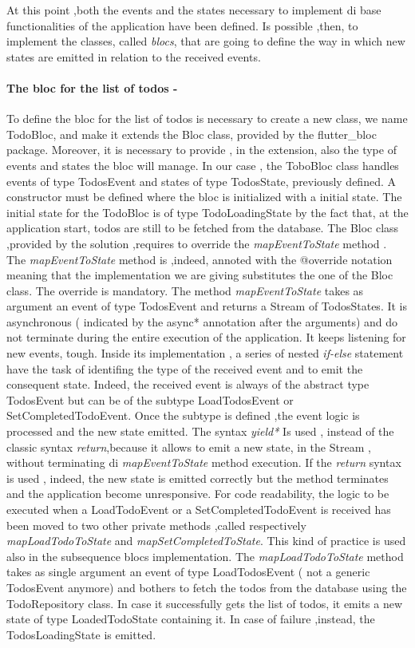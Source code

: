 At this point ,both the events and the states necessary to implement di base functionalities of the application have been defined. Is possible ,then, to implement the classes, called \textit{blocs}, that are going to define the way in which new states are emitted in relation to the received events.

\paragraph{The bloc for the list of todos - }
\label{subpar:todo_app_bloc_core_state}

To define the bloc for the list of todos is necessary to create a new class, we name TodoBloc, and make it extends the Bloc class, provided by the flutter\_bloc package. Moreover, it is necessary to provide , in the extension, also the type of events and states the bloc will manage. In our case , the ToboBloc class handles events of type TodosEvent and states of type TodosState, previously defined. A constructor must be defined where the bloc is initialized with a initial state. The initial state for the TodoBloc is of type TodoLoadingState by the fact that, at the application start, todos are still to be fetched from the database.
The Bloc class ,provided by the solution ,requires to override the \textit{mapEventToState} method . The \textit{mapEventToState} method is ,indeed, annoted with the @override notation meaning that the implementation we are giving substitutes the one of the Bloc class. The override is mandatory. The method \textit{mapEventToState} takes as argument an event of type TodosEvent and returns a Stream of TodosStates. It is asynchronous ( indicated by the async* annotation after the arguments) and do not terminate during the entire execution of the application. It keeps listening for new events, tough. Inside its implementation , a series of nested \textit{if-else }statement have the task of identifing the type of the received event and to emit the consequent state. Indeed, the received event is always of the abstract type TodosEvent but can be of the subtype LoadTodosEvent or SetCompletedTodoEvent. Once the subtype is defined ,the event logic is processed and the new state emitted.  The syntax \textit{yield*} Is used , instead of the classic syntax \textit{return},because it allows to emit a new state, in the Stream , without terminating di \textit{mapEventToState} method execution. If the \textit{return} syntax is used , indeed, the new state is emitted correctly but the method terminates and the application become unresponsive. For code readability, the logic to be executed when a LoadTodoEvent or a SetCompletedTodoEvent is received has been moved to two other private methods ,called respectively \textit{mapLoadTodoToState} and \textit{mapSetCompletedToState}. This kind of practice is used also in the subsequence blocs implementation. The \textit{mapLoadTodoToState} method takes as single argument an event of type LoadTodosEvent ( not a generic TodosEvent anymore) and bothers to fetch the todos from the database using the TodoRepository class. In case it successfully gets the list of todos, it emits a new state of type LoadedTodoState containing it. In case of failure ,instead, the TodosLoadingState is emitted.

